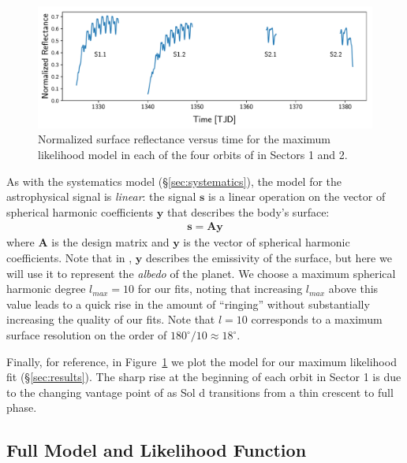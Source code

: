 \documentclass[modern]{aastex62}
\begin{document}
\begin{figure}[t!]
    \begin{centering}
    \includegraphics[width=\linewidth]{figures/starry_model.pdf}
    \caption{\label{fig:starry_model}
             Normalized surface reflectance versus time for the maximum
             likelihood \starry model in each of the four orbits of \TESS
             in Sectors 1 and 2.
             }
    \end{centering}
\end{figure}

As with the systematics model (\S\ref{sec:systematics}), the model
for the astrophysical signal is \emph{linear}: the signal $\mathbf{s}$ 
is a linear operation on the vector of spherical harmonic coefficients 
$\mathbf{y}$
that describes the body's surface:
%
\begin{align}
    \mathbf{s} = \mathbf{A} \mathbf{y}
\end{align}
%
where $\mathbf{A}$ is the design matrix and $\mathbf{y}$ is the vector of spherical harmonic coefficients. 
Note that in \cite{Luger2019}, $\mathbf{y}$ describes the emissivity of the surface,
but here we will use it to represent the \emph{albedo} of the planet.
We choose a maximum spherical harmonic degree $l_{max} = 10$ for our fits,
noting that increasing $l_{max}$ above this value 
leads to a quick rise in the amount of ``ringing'' without substantially
increasing the quality of our fits. Note that $l = 10$ corresponds to
a maximum surface resolution on the order of $180^\circ/10 \approx 18^\circ$.

Finally, for reference, in Figure~\ref{fig:starry_model} we plot the
\starry model for our maximum likelihood fit (\S\ref{sec:results}). The
sharp rise at the beginning of each orbit in Sector 1 is due to the changing
vantage point of \TESS as Sol d transitions from a thin crescent to full phase.

\subsection{Full Model and Likelihood Function}
\label{sec:model}
\end{document}
